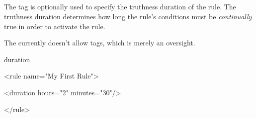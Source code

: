 
\subsection{}

The  tag is optionally used to specify the truthness
duration of the rule.  The truthness duration determines how long
the rule's conditions must be \emph{continually} true in order
to activate the rule.

\begin{implnote}
The  currently doesn't allow 
tags, which is merely an oversight. 
\end{implnote}

\begin{tagDesc}{duration}
\attrs
\end{tagDesc}

\begin{center}
\begin{minipage}{0.8\textwidth}
\begin{tagExample}
<rule name="My First Rule">

    {\color{black}<duration hours="2"}
              {\color{black}minutes="30"/>}

</rule>
\end{tagExample}
\end{minipage}
\end{center}
